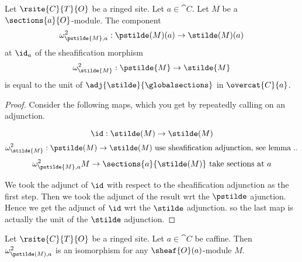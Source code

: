 \begin{lemma}
Let $\rsite{C}{T}{O}$ be a ringed site.
Let $a \in \cat{C}$.
Let $M$ be a $\sections{a}{O}$-module.
The component 
\[\omega^2_{\pstilde{M},a}: \pstilde(M)(a) \rightarrow \stilde(M)(a)\] 
at $\id_a$
of the sheafification morphism 
\[\omega^2_{\stilde{M}}: \pstilde{M} \rightarrow \stilde{M}\]
is equal to 
the unit of $\adj{\stilde}{\globalsections}$ 
in $\overcat{C}{a}$.
\end{lemma}

\begin{proof}
Consider the following maps, which you get by repeatedly calling on an adjunction.

\[\id :\stilde(M) \rightarrow \stilde(M)\]
\[\omega^2_{\stilde{M}} : \pstilde(M) \rightarrow \stilde(M) 
	\mbox{ use sheafification adjunction, see lemma ..}
\]
\[\omega^2_{\pstilde{M},a} M \rightarrow \sections{a}{\stilde(M)} \mbox{ take sections at $a$}\]

We took the adjunct of $\id$ with respect to the sheafification adjunction as the first step.
Then we took the adjunct of the result wrt the $\pstilde$ ajunction.
Hence we get the adjunct of $\id$ wrt the $\stilde$ adjunction.
so the last map is actually the unit of the $\stilde$ adjunction.
\end{proof}

\begin{corollary}
Let $\rsite{C}{T}{O}$ be a ringed site.
Let $a \in \cat{C}$ be caffine.
Then $\omega^2_{\pstilde(M),a}$ is an isomorphism for any $\sheaf{O}(a)$-module $M$.
\end{corollary}
